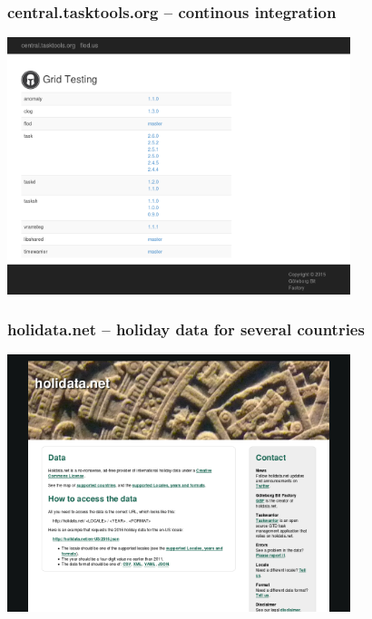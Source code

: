 \documentclass[t,handout]{beamer}
\begin{document}
\begin{frame}\frametitle{central.tasktools.org -- continous integration}
    \begin{center}
        \href{http://central.tasktools.org/}{\includegraphics[width=10cm,height=7.5cm]{central-tasktools-org.png}}
    \end{center}
\end{frame}

\begin{frame}\frametitle{holidata.net -- holiday data for several countries}
    \begin{center}
        \href{http://holidata.net/}{\includegraphics[width=10cm,height=7.5cm]{holidata-net.png}}
    \end{center}
\end{frame}
\end{document}
